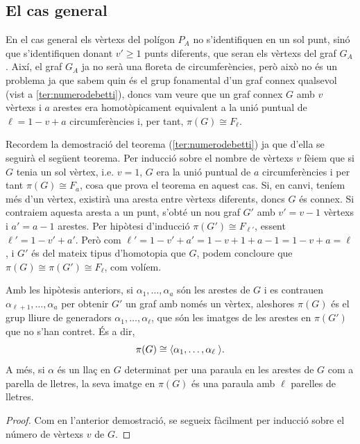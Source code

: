 \documentclass[../main.tex]{subfiles}
\begin{document}
\subsection{El cas general}

En el cas general els vèrtexs del polígon $P_A$ no s'identifiquen en un sol punt, sinó que s'identifiquen donant $v'\geq 1$ punts diferents, que seran els vèrtexs del graf $G_A$. Així, el graf $G_A$ ja no serà una floreta de circumferències, però això no és un problema ja que sabem quin és el grup fonamental d'un graf connex qualsevol (vist a \ref{ter:numerodebetti}), doncs vam veure que un graf connex $G$ amb $v$ vèrtexs i $a$ arestes era homotòpicament equivalent a la unió puntual de $\ell = 1-v+a$ circumferències i, per tant, $\pi(G)\cong F_\ell$.

Recordem la demostració del teorema (\ref{ter:numerodebetti}) ja que d'ella se seguirà el següent teorema. Per inducció sobre el nombre de vèrtexs $v$ fèiem que si $G$ tenia un sol vèrtex, i.e. $v=1$, $G$ era la unió puntual de $a$ circumferències i per tant $\pi(G)\cong F_a$, cosa que prova el teorema en aquest cas. Si, en canvi, teníem més d'un vèrtex, existirà una aresta entre vèrtexs diferents, doncs $G$ és connex. Si contraiem aquesta aresta a un punt, s'obté un nou graf $G'$ amb $v'=v-1$ vèrtexs i $a'=a-1$ arestes. Per hipòtesi d'inducció $\pi(G')\cong F_{\ell'}$, essent $\ell' = 1-v'+a'$. Però com $\ell' = 1-v'+a'=1-v+1+a-1=1-v+a=\ell$, i $G'$ és del mateix tipus d'homotopia que $G$, podem concloure que $\pi(G)\cong \pi(G')\cong F_\ell$, com volíem.

\begin{ter}
\label{ter:grupdelgrafgeneral} Amb les hipòtesis anteriors, si $\alpha_1,\ldots,\alpha_a$ són les arestes de $G$ i es contrauen $\alpha_{\ell+1},\ldots,\alpha_a$ per obtenir $G'$ un graf amb només un vèrtex, aleshores $\pi(G)$ és el grup lliure de generadors $\alpha_1,\ldots,\alpha_\ell$, que són les imatges de les arestes en $\pi(G')$ que no s'han contret. És a dir,
\begin{equation}
    \notag
    \pi(G)\cong\langle \alpha_1,\ldots,\alpha_\ell\;\rangle.
\end{equation}
A més, si $\alpha$ és un llaç en $G$ determinat per una paraula en les arestes de $G$ com a parella de lletres, la seva imatge en $\pi(G)$ és una paraula amb $\ell$ parelles de lletres.
\end{ter}
\begin{proof}
Com en l'anterior demostració, se segueix fàcilment per inducció sobre el número de vèrtexs $v$ de $G$.
\end{proof}
\end{document}

